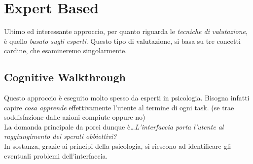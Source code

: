\documentclass[oneside]{book}
\begin{document}
			\pagebreak

	\section{Expert Based} \label{sec:expertBased}
		Ultimo ed interessante approccio, per quanto riguarda le \emph{tecniche di valutazione}, è quello \emph{basato sugli esperti}. Questo tipo di valutazione, si basa su tre concetti cardine, che esamineremo singolarmente. 

		\subsection{Cognitive Walkthrough}
			Questo approccio è eseguito molto spesso da esperti in psicologia. Bisogna infatti capire \emph{cosa apprende} effettivamente l'utente al termine di ogni task. (se trae soddisfazione dalle azioni compiute oppure no) \\
			La domanda principale da porci dunque è\dots \emph{L'interfaccia porta l'utente al raggiungimento dei sperati obbiettivi?} \\

			In sostanza, grazie ai principi della psicologia, si riescono ad identificare gli eventuali problemi dell'interfaccia.
\end{document}
